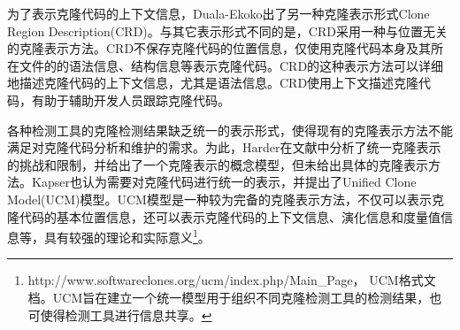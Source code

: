 为了表示克隆代码的上下文信息，Duala-Ekoko出了另一种克隆表示形式Clone Region Description(CRD)\cite{duala2010clone}。与其它表示形式不同的是，CRD采用一种与位置无关的克隆表示方法。CRD不保存克隆代码的位置信息，仅使用克隆代码本身及其所在文件的的语法信息、结构信息等表示克隆代码。CRD的这种表示方法可以详细地描述克隆代码的上下文信息，尤其是语法信息。CRD使用上下文描述克隆代码，有助于辅助开发人员跟踪克隆代码。%

各种检测工具的克隆检测结果缺乏统一的表示形式，使得现有的克隆表示方法不能满足对克隆代码分析和维护的需求。为此，Harder在文献\cite{harder2013limits}中分析了统一克隆表示的挑战和限制，并给出了一个克隆表示的概念模型，但未给出具体的克隆表示方法。Kapser也认为需要对克隆代码进行统一的表示，并提出了Unified Clone Model(UCM)模型\cite{kapser2012common}。UCM模型是一种较为完备的克隆表示方法，不仅可以表示克隆代码的基本位置信息，还可以表示克隆代码的上下文信息、演化信息和度量值信息等，具有较强的理论和实际意义\footnote{http://www.softwareclones.org/ucm/index.php/Main\_Page， UCM格式文档。UCM旨在建立一个统一模型用于组织不同克隆检测工具的检测结果，也可使得检测工具进行信息共享。}。



